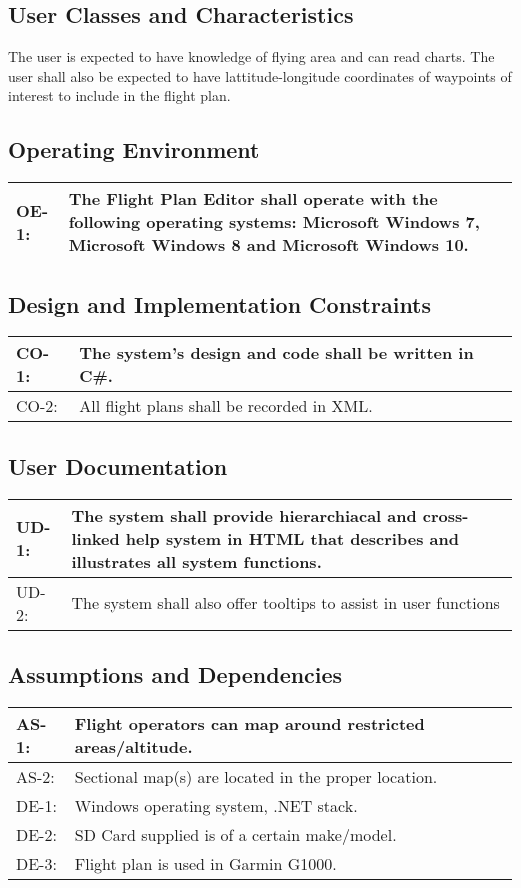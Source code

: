 \documentclass[12pt, letterpaper]{article}
\begin{document}
  \subsection{User Classes and Characteristics}
    The user is expected to have knowledge of flying area and can read charts.
    The user shall also be expected to have lattitude-longitude coordinates of
    waypoints of interest to include in the flight plan.
  \subsection{Operating Environment}
    \begin{tabularx}{\textwidth}{|l|X|} \hline
      OE-1: & The Flight Plan Editor shall operate with the following operating systems:
              Microsoft Windows 7, Microsoft Windows 8 and Microsoft Windows 10. \\ \hline
    \end{tabularx}
  \subsection{Design and Implementation Constraints}
    \begin{tabularx}{\textwidth}{|l|X|} \hline
      CO-1: & The system's design and code shall be written in C\#. \\ \hline
      CO-2: & All flight plans shall be recorded in XML. \\ \hline
    \end{tabularx}
  \subsection{User Documentation}
    \begin{tabularx}{\textwidth}{|l|X|} \hline
      UD-1: & The system shall provide hierarchiacal and cross-linked help system in HTML that
              describes and illustrates all system functions.\\ \hline
      UD-2: & The system shall also offer tooltips to assist in user functions \\ \hline
    \end{tabularx}
  \subsection{Assumptions and Dependencies}
    \begin{tabularx}{\textwidth}{|l|X|} \hline
      AS-1: & Flight operators can map around restricted areas/altitude. \\ \hline
      AS-2: & Sectional map(s) are located in the proper location. \\ \hline
      DE-1: & Windows operating system, .NET stack. \\ \hline
      DE-2: & SD Card supplied is of a certain make/model. \\ \hline
      DE-3: & Flight plan is used in Garmin G1000. \\ \hline
    \end{tabularx}
\end{document}
